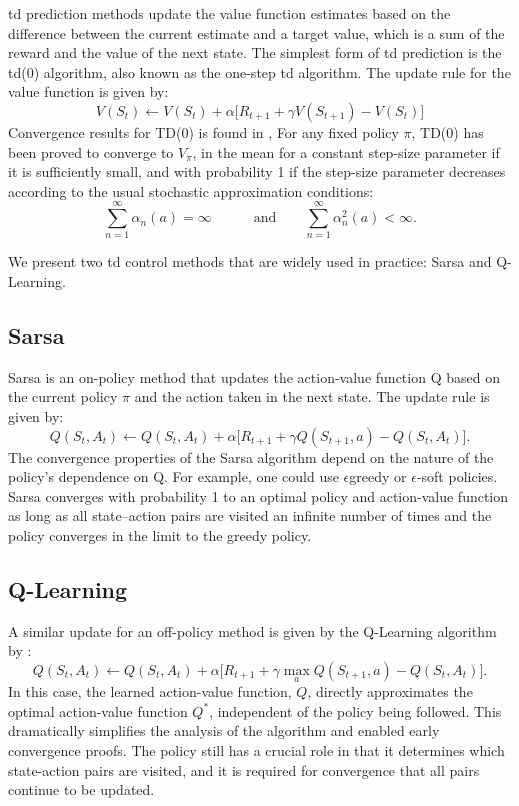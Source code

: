 \gls{td} prediction methods update the value function estimates based on the difference between the
current estimate and a target value, which is a sum of the reward and the value of the next state.
The simplest form of \gls{td} prediction is the \gls{td}(0) algorithm, also known as the one-step \gls{td}
algorithm. The update rule for the value function is given by:
\[
V(S_t) \leftarrow V(S_t) + \alpha \Big[ R_{t+1} + \gamma V(S_{t+1}) - V(S_t) \Big]
\]
Convergence results for TD(0) is found in \cite{10.1023/A:1022633531479}, For any fixed policy $\pi$, 
TD(0) has
been proved to converge to $V_\pi$, in the mean for a constant step-size parameter if it is
sufficiently small, and with probability 1 if the step-size parameter decreases according to
the usual stochastic approximation conditions:
\begin{equation}
\sum_{n=1}^{\infty}\alpha_{n}(a)=\infty\quad\quad\quad\mbox{and}\quad\quad\sum_{n=1}^{\infty}\alpha_{n}^{2}(a)<\infty.
\end{equation}

We present two \gls{td} control methods that are widely used in practice: Sarsa and Q-Learning.

\subsection{Sarsa} Sarsa is an on-policy method that updates the action-value function Q based on the
current policy $\pi$ and the action taken in the next state. The update rule is given by:
\[
Q(S_t,A_t) \leftarrow Q(S_t,A_t) + \alpha \Big[ R_{t+1} + \gamma Q(S_{t+1},a) - Q(S_t,A_t) \Big].
\]
The convergence properties of the Sarsa algorithm depend on the nature of the policy’s
dependence on Q. For example, one could use $\epsilon$greedy or $\epsilon$-soft policies. Sarsa converges
with probability 1 to an optimal policy and action-value function as long as all state–action
pairs are visited an infinite number of times and the policy converges in the limit to
the greedy policy.

\subsection{Q-Learning}
A similar update for an off-policy method is given by the Q-Learning algorithm by \cite{Watkins1992Qlearning}:
\[
Q(S_t,A_t) \leftarrow Q(S_t,A_t) + \alpha \Big[ R_{t+1} + \gamma \max_a Q(S_{t+1},a) - Q(S_t,A_t) \Big].
\]
In this case, the learned action-value function, $Q$, directly approximates the optimal
action-value function $Q^*$,  independent of the policy being followed. This dramatically
simplifies the analysis of the algorithm and enabled early convergence proofs. The policy
still has a crucial role in that it determines which state-action pairs are visited,
and it is required for convergence that all pairs continue to be updated.

